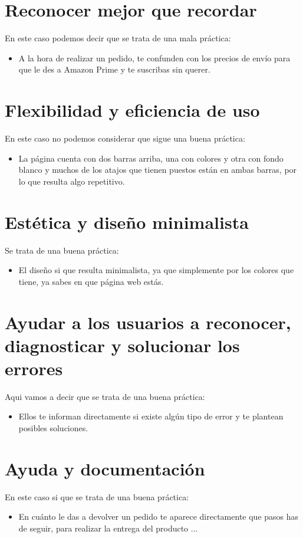 \documentclass[openany,overnay,a4paper, twoside, 14pt]{book}
\begin{document}
\section*{Reconocer mejor que recordar}
En este caso podemos decir que se trata de una mala práctica:
\begin{itemize}
\item A la hora de realizar un pedido, te confunden con los precios de envío para que le des a Amazon Prime y te suscribas sin querer.
\end{itemize}
\section*{Flexibilidad y eficiencia de uso}
En este caso no podemos considerar que sigue una buena práctica:
\begin{itemize}
\item La página cuenta con dos barras arriba, una con colores y otra con fondo blanco y muchos de los atajos que tienen puestos están en ambas barras, por lo que resulta algo repetitivo.
\end{itemize}
\section*{Estética y diseño minimalista}
Se trata de una buena práctica:
\begin{itemize}
    \item El diseño si que resulta minimalista, ya que simplemente por los colores que tiene, ya sabes en que página web estás.
\end{itemize}
\section*{Ayudar a los usuarios a reconocer, diagnosticar y solucionar los errores}
Aqui vamos a decir que se trata de una buena práctica:
\begin{itemize}
    \item Ellos te informan directamente si existe algún tipo de error y te plantean posibles soluciones.
\end{itemize}
\section*{Ayuda y documentación}
En este caso si que se trata de una buena práctica:
\begin{itemize}
    \item En cuánto le das a devolver un pedido te aparece directamente que pasos has de seguir, para realizar la entrega del producto ...
\end{itemize}
\setcounter{chapter}{3}
\setcounter{section}{0}
\end{document}
